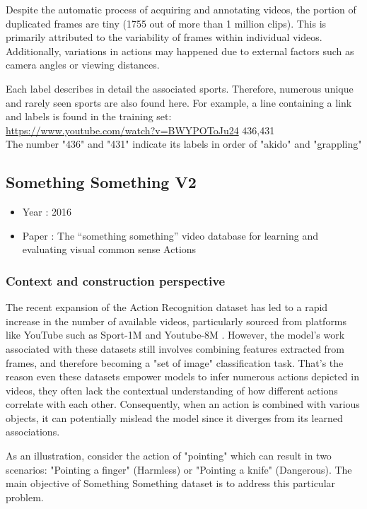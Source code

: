 \documentclass[10pt,onecolumn,letterpaper]{article}
\begin{document}
Despite the automatic process of acquiring and annotating videos, the portion of duplicated frames are tiny (1755 out of more than 1 million clips). This is primarily attributed to the variability of frames within individual videos. Additionally, variations in actions may happened due to external factors such as camera angles or viewing distances.

Each label describes in detail the associated sports. Therefore, numerous unique and rarely seen sports are also found here.
For example, a line containing a link and labels is found in the training set: \\
\url{https://www.youtube.com/watch?v=BWYPOToJu24} 436,431 \\
The number "436" and "431" indicate its labels in order of "akido" and "grappling"
\subsection{Something Something V2}

\begin{itemize}
	\item Year : 2016
	\item Paper : The “something something” video database for learning and evaluating visual common sense
	Actions \cite{somethingsomething}
\end{itemize}

\subsubsection{\textbf{Context and construction perspective}}

The recent expansion of the Action Recognition dataset has led to a rapid increase in the number of available videos, particularly sourced from platforms like YouTube such as Sport-1M \cite{Sports1M} and Youtube-8M \cite{YouTube8M}. However, the model's work associated with these datasets still involves combining features extracted from frames, and therefore becoming a "set of image" classification task. That's the reason even these datasets empower models to infer numerous actions depicted in videos, they often lack the contextual understanding of how different actions correlate with each other. Consequently, when an action is combined with various objects, it can potentially mislead the model since it diverges from its learned associations. 

As an illustration, consider the action of "pointing" which can result in two scenarios: "Pointing a finger" (Harmless) or "Pointing a knife" (Dangerous). The main objective of Something Something dataset is to address this particular problem.
\end{document}
